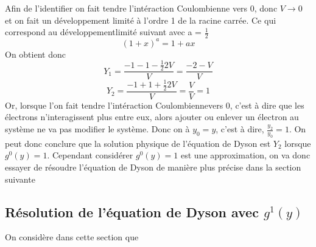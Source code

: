 \documentclass[12pt]{article}
\begin{document}
Afin de l'identifier on fait tendre l'int\'eraction Coulombienne vers 0, donc $V\rightarrow 0$ et on fait un d\'eveloppement limit\'e \`a l'ordre 1 de la racine carr\'ee. Ce qui correspond au d\'eveloppementlimit\'e suivant avec a = $\frac{1}{2}$
\begin{equation}
 (1 + x)^a = 1 + ax 
\end{equation}
On obtient donc 
\begin{equation}
 Y_1 = \frac{-1 -1 - \frac{1}{2} 2 V }{V} =\frac{-2 -V}{V}
\end{equation}
\begin{equation}
 Y_2 = \frac{-1 + 1 +\frac{1}{2}2V }{V} = \frac{V}{V} = 1
\end{equation}
Or, lorsque l'on fait tendre l'int\'eraction Coulombiennevers 0, c'est \`a dire que les \'electrons n'interagissent plus entre eux, alors ajouter ou enlever un \'electron au syst\`eme ne va pas modifier le syst\`eme. Donc on \`a $y_0 = y$, c'est à dire, $\frac{y_2}{y_0} = 1$.
On peut donc conclure que la solution physique de l'\'equation de Dyson est $Y_2$ lorsque $g^0(y) = 1$.
\newline
Cependant consid\'erer $g^0(y) = 1$ est une approximation, on va donc essayer de r\'esoudre l'\'equation de Dyson de mani\`ere plus pr\'ecise dans la section suivante

\subsection{R\'esolution de l'\'equation de Dyson avec $g^1(y)$}
On consid\`ere dans cette section que 
\end{document}
